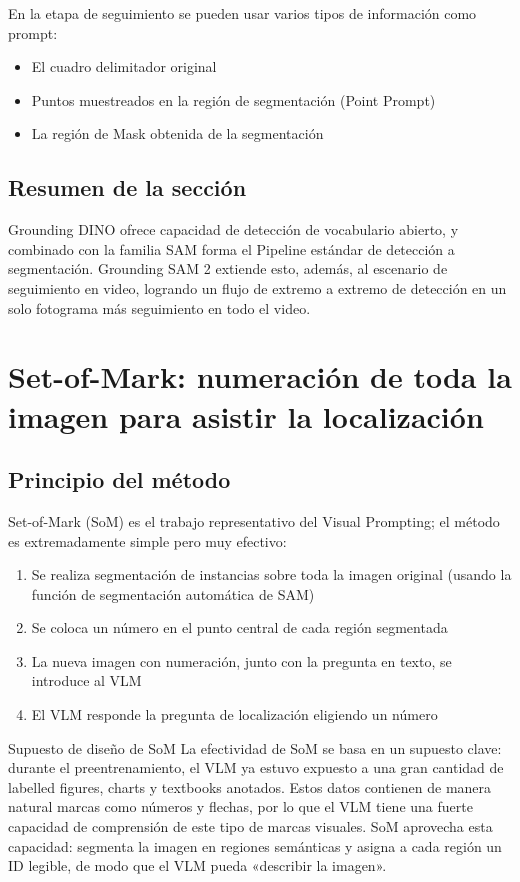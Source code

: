 \documentclass[a4paper]{article}
\begin{document}
En la etapa de seguimiento se pueden usar varios tipos de información como prompt:
\begin{itemize}
    \item El cuadro delimitador original
    \item Puntos muestreados en la región de segmentación (Point Prompt)
    \item La región de Mask obtenida de la segmentación
\end{itemize}

\subsection{Resumen de la sección}

Grounding DINO ofrece capacidad de detección de vocabulario abierto, y combinado con la familia SAM forma el Pipeline estándar de detección a segmentación. Grounding SAM 2 extiende esto, además, al escenario de seguimiento en video, logrando un flujo de extremo a extremo de detección en un solo fotograma más seguimiento en todo el video.

\section{Set-of-Mark: numeración de toda la imagen para asistir la localización}

\subsection{Principio del método}

Set-of-Mark (SoM) es el trabajo representativo del Visual Prompting; el método es extremadamente simple pero muy efectivo:

\begin{enumerate}
    \item Se realiza segmentación de instancias sobre toda la imagen original (usando la función de segmentación automática de SAM)
    \item Se coloca un número en el punto central de cada región segmentada
    \item La nueva imagen con numeración, junto con la pregunta en texto, se introduce al VLM
    \item El VLM responde la pregunta de localización eligiendo un número
\end{enumerate}

\begin{importantbox}{Supuesto de diseño de SoM}
La efectividad de SoM se basa en un supuesto clave: durante el preentrenamiento, el VLM ya estuvo expuesto a una gran cantidad de labelled figures, charts y textbooks anotados. Estos datos contienen de manera natural marcas como números y flechas, por lo que el VLM tiene una fuerte capacidad de comprensión de este tipo de marcas visuales. SoM aprovecha esta capacidad: segmenta la imagen en regiones semánticas y asigna a cada región un ID legible, de modo que el VLM pueda «describir la imagen».
\end{importantbox}
\end{document}

